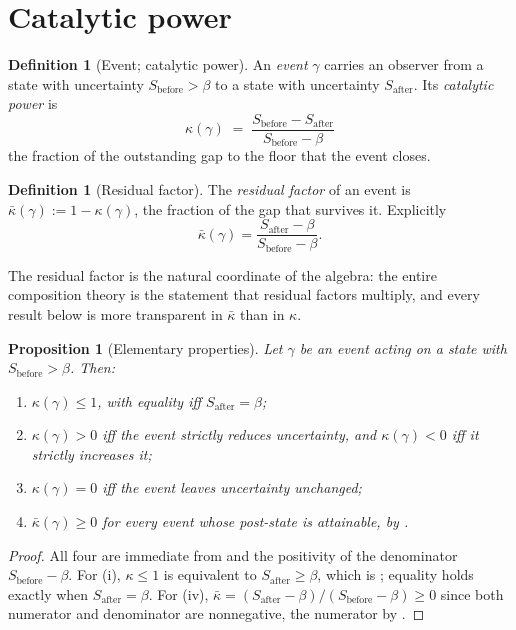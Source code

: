\documentclass[11pt,a4paper]{article}
\theoremstyle{thmstyle}
\newtheorem{proposition}[theorem]{Proposition}
\theoremstyle{definition}
\newtheorem{definition}[theorem]{Definition}
\theoremstyle{remark}
\newcommand{\flo}{\beta}
\newcommand{\kap}{\kappa}
\begin{document}
\section{Catalytic power}
\label{sec:power}

\begin{definition}[Event; catalytic power]
\label{def:power}
An \emph{event} $\gamma$ carries an observer from a state with uncertainty
$S_{\mathrm{before}}>\flo$ to a state with uncertainty $S_{\mathrm{after}}$.
Its \emph{catalytic power} is
\[
\boxed{\ \kap(\gamma)\;=\;\frac{S_{\mathrm{before}}-S_{\mathrm{after}}}
{S_{\mathrm{before}}-\flo}\ }
\]
the fraction of the outstanding gap to the floor that the event closes.
\end{definition}

\begin{definition}[Residual factor]
\label{def:resfactor}
The \emph{residual factor} of an event is $\bar\kap(\gamma):=1-\kap(\gamma)$,
the fraction of the gap that survives it. Explicitly
\[
\bar\kap(\gamma)=\frac{S_{\mathrm{after}}-\flo}{S_{\mathrm{before}}-\flo}.
\]
\end{definition}

The residual factor is the natural coordinate of the algebra: the entire
composition theory is the statement that residual factors multiply, and
every result below is more transparent in $\bar\kap$ than in $\kap$.

\begin{proposition}[Elementary properties]
\label{prop:elementary}
Let $\gamma$ be an event acting on a state with $S_{\mathrm{before}}>\flo$.
Then:
\begin{enumerate}[label=\textup{(\roman*)},leftmargin=2.2em]
\item $\kap(\gamma)\le1$, with equality iff $S_{\mathrm{after}}=\flo$;
\item $\kap(\gamma)>0$ iff the event strictly reduces uncertainty, and
$\kap(\gamma)<0$ iff it strictly increases it;
\item $\kap(\gamma)=0$ iff the event leaves uncertainty unchanged;
\item $\bar\kap(\gamma)\ge0$ for every event whose post-state is attainable,
by .
\end{enumerate}
\end{proposition}

\begin{proof}
All four are immediate from  and the
positivity of the denominator $S_{\mathrm{before}}-\flo$. For (i), $\kap\le1$
is equivalent to $S_{\mathrm{after}}\ge\flo$, which is
; equality holds exactly when $S_{\mathrm{after}}=\flo$.
For (iv), $\bar\kap=(S_{\mathrm{after}}-\flo)/(S_{\mathrm{before}}-\flo)\ge0$
since both numerator and denominator are nonnegative, the numerator by
.
\end{proof}
\end{document}
